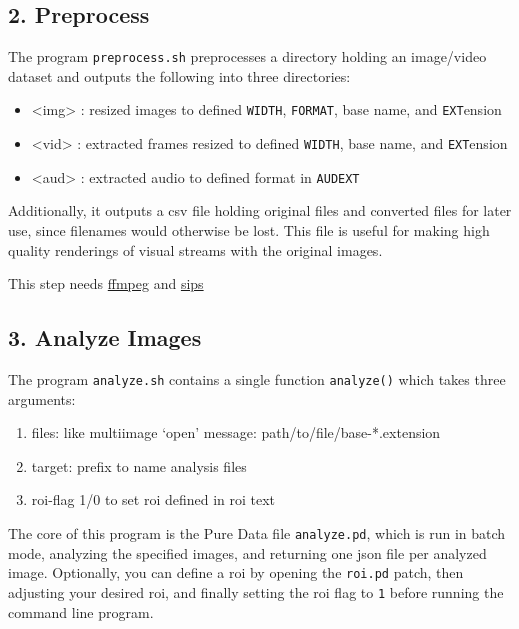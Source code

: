 \subsection*{2. Preprocess}

The program \texttt{preprocess.sh} preprocesses a directory holding an image/video dataset and outputs the following into three directories:

\begin{itemize}
  \singlespacing
\item <img> : resized images to defined \texttt{WIDTH}, \texttt{FORMAT}, base name, and \texttt{EXT}ension
\item <vid> : extracted frames resized to defined \texttt{WIDTH}, base name, and \texttt{EXT}ension
\item <aud> : extracted audio to defined format in \texttt{AUDEXT}
\end{itemize}

Additionally, it outputs a \gls{csv} file holding original files and converted files for later use, since filenames would otherwise be lost. This file is useful for making high quality renderings of visual streams with the original images. 

This step needs \href{https://ffmpeg.org/ffmpeg.html}{ffmpeg} and \href{https://ss64.com/osx/sips.html}{sips}


\subsection*{3. Analyze Images}

The program \texttt{analyze.sh} contains a single function \texttt{analyze()}  which takes three arguments:

\begin{enumerate}
\singlespacing
\item files: like multiimage `open' message: path/to/file/base-*.extension
\item target: prefix to name analysis files
\item roi-flag 1/0 to set roi defined in roi text
\end{enumerate}

The core of this program is the Pure Data file \texttt{analyze.pd}, which is run in batch mode, analyzing the specified images, and returning one \gls{json} file per analyzed image. Optionally, you can define a \gls{roi} by opening the \texttt{roi.pd} patch, then adjusting your desired \gls{roi}, and finally setting the \gls{roi} flag to \texttt{1} before running the command line program.

